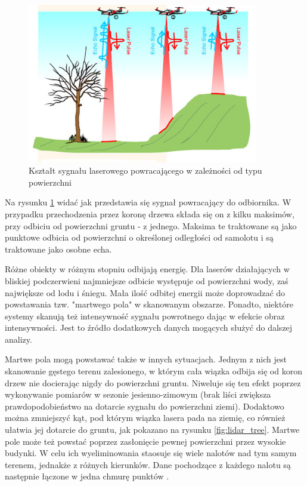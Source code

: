 \begin{figure}[h!]
    \centering
    \includegraphics[width=0.9\textwidth]{img/lidar_beam.jpg}
    \caption{Kształt sygnału laserowego powracającego w zależności od typu powierzchni}
    \label{fig:lidar_beam}
\end{figure}

Na rysunku \ref{fig:lidar_beam} widać jak przedstawia się sygnał powracający do odbiornika. W przypadku przechodzenia przez koronę drzewa składa się on z kilku
maksimów, przy odbiciu od powierzchni gruntu - z jednego. Maksima te traktowane są jako punktowe odbicia od powierzchni o określonej odległości od samolotu i są traktowane
jako osobne echa.

Różne obiekty w różnym stopniu odbijają energię. Dla laserów działających w bliskiej podczerwieni najmniejsze odbicie występuje od powierzchni wody,
zaś największe od lodu i śniegu. Mała ilość odbitej energii może doprowadzać do powstawania tzw. "martwego pola" w skanowanym obszarze. Ponadto, niektóre
systemy skanują też intensywność sygnału powrotnego dając w efekcie obraz intensywności. Jest to źródło dodatkowych danych mogących służyć do dalszej analizy.

Martwe pola mogą powstawać także w innych sytuacjach. Jednym z nich jest skanowanie gęstego terenu zalesionego, w którym cała wiązka odbija się od koron drzew
nie docierając nigdy do powierzchni gruntu. Niweluje się ten efekt poprzez wykonywanie pomiarów w sezonie jesienno-zimowym (brak liści zwiększa prawdopodobieństwo
na dotarcie sygnału do powierzchni ziemi). Dodaktowo można zmniejszyć kąt, pod którym wiązka lasera pada na ziemię, co również ułatwia jej dotarcie do gruntu,
jak pokazano na rysunku \ref{fig:lidar_tree}. Martwe pole może też powstać poprzez zasłonięcie pewnej powierzchni przez wysokie budynki. W celu ich wyeliminowania
staosuje się wiele nalotów nad tym samym terenem, jednakże z różnych kierunków. Dane pochodzące z każdego nalotu są następnie łączone w jedna chmurę punktów \cite{isok_manual}.


